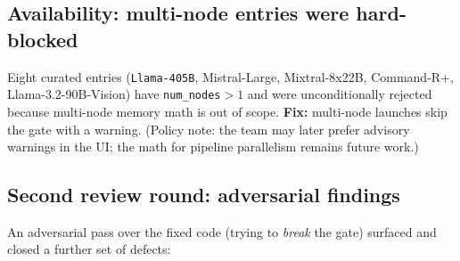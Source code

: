 \documentclass[11pt]{article}
\newcommand{\code}[1]{\texttt{#1}}
\begin{document}
\subsection{Availability: multi-node entries were hard-blocked}

Eight curated entries (\code{Llama-405B}, Mistral-Large, Mixtral-8x22B,
Command-R+, Llama-3.2-90B-Vision) have \code{num\_nodes}$>1$ and were
unconditionally rejected because multi-node memory math is out of scope.
\textbf{Fix:} multi-node launches skip the gate with a warning. (Policy note:
the team may later prefer advisory warnings in the UI; the math for pipeline
parallelism remains future work.)

\subsection{Second review round: adversarial findings}

An adversarial pass over the fixed code (trying to \emph{break} the gate)
surfaced and closed a further set of defects:
\end{document}
